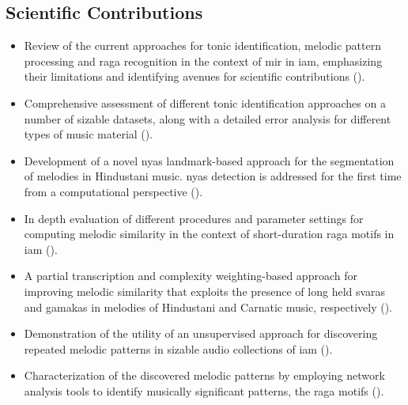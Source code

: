 \subsection*{Scientific Contributions}

\begin{itemize}
	
	\item Review of the current approaches for tonic identification, melodic pattern processing and \gls{raga} recognition in the context of \gls{mir} in \gls{iam}, emphasizing their limitations and identifying avenues for scientific contributions ().
	
	\item Comprehensive assessment of different tonic identification approaches on a number of sizable datasets,  along with a detailed error analysis for different types of music material ().
	
	\item Development of a novel \gls{nyas} landmark-based approach for the segmentation of melodies in Hindustani music. \Gls{nyas} detection is addressed for the first time from a computational perspective ().
	
	\item In depth evaluation of different procedures and parameter settings for computing melodic similarity in the context of short-duration \gls{raga} motifs in \gls{iam} (). 
	
	\item A partial transcription and complexity weighting-based approach for improving melodic similarity that exploits the presence of long held \glspl{svara} and \glspl{gamaka} in melodies of Hindustani and Carnatic music, respectively ().
	
	\item Demonstration of the utility of an unsupervised approach for discovering repeated melodic patterns in sizable audio collections of \gls{iam} ().
	
	\item Characterization of the discovered melodic patterns by employing network analysis tools to identify musically significant patterns, the \gls{raga} motifs (). 
	

\end{itemize}
